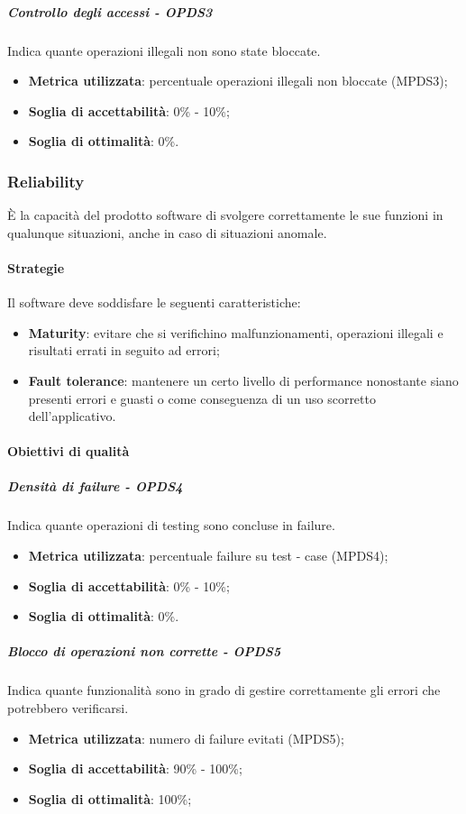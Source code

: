 \documentclass[PianoDiQualifica.tex]{subfiles}
\begin{document}
				\subparagraph{Controllo degli accessi - OPDS3}
				Indica quante operazioni illegali non sono state bloccate.
				\begin{itemize}
					\item \textbf{Metrica utilizzata}: percentuale operazioni illegali non bloccate (MPDS3);
					\item \textbf{Soglia di accettabilità}: 0\% - 10\%;
					\item \textbf{Soglia di ottimalità}: 0\%.
				\end{itemize}
		
		\subsubsection{Reliability}
		È la capacità del prodotto software di svolgere correttamente le sue funzioni in qualunque situazioni, anche in caso di situazioni anomale.
		
			\paragraph{Strategie}
			Il software deve soddisfare le seguenti caratteristiche:
			\begin{itemize}
				\item \textbf{Maturity}: evitare che si verifichino malfunzionamenti, operazioni illegali e risultati errati in seguito ad errori;
				\item \textbf{Fault tolerance}: mantenere un certo livello di performance nonostante siano presenti errori e guasti o come conseguenza di un uso scorretto dell'applicativo.
			\end{itemize}
			
			\paragraph{Obiettivi di qualità}
				\subparagraph{Densità di failure - OPDS4}
				Indica quante operazioni di testing sono concluse in failure.
				\begin{itemize}
					\item \textbf{Metrica utilizzata}: percentuale failure su test - case (MPDS4);
					\item \textbf{Soglia di accettabilità}: 0\% - 10\%;
					\item \textbf{Soglia di ottimalità}: 0\%.
				\end{itemize}
				
				\subparagraph{Blocco di operazioni non corrette - OPDS5}
				Indica quante funzionalità sono in grado di gestire correttamente gli errori che potrebbero verificarsi.
				\begin{itemize}
					\item \textbf{Metrica utilizzata}: numero di failure evitati (MPDS5);
					\item \textbf{Soglia di accettabilità}: 90\% - 100\%;
					\item \textbf{Soglia di ottimalità}: 100\%;
				\end{itemize}
		
\end{document}
